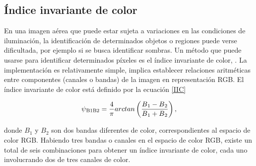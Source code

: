 \subsection{Índice invariante de color} \label{seccion iic}
En una imagen aérea que puede estar sujeta a variaciones en las condiciones de iluminación, la identificación de determinados objetos o regiones puede verse dificultada, por ejemplo si se busca identificar sombras. Un método que puede usarse para identificar determinados píxeles es el índice invariante de color, \cite{gevers_pictoseek_2000, tsai_comparative_2006, singhal_automatic_2014, noauthor_using_nodate, sirmacek_building_2008, chang_unsupervised_nodate}. La implementación es relativamente simple, implica establecer relaciones aritméticas entre componentes (canales o bandas) de la imagen en representación RGB. El índice invariante de color está definido por la ecuación \ref{IIC} 


\begin{equation}
	\psi\textsubscript{B1B2}=\frac{4}{\pi} arctan\left(\frac{B\textsubscript{1}-B\textsubscript{2}}{B\textsubscript{1}+B\textsubscript{2}}\right),\label{IIC}
\end{equation}

 donde $B_1$ y $B_2$ son dos bandas diferentes de color, correspondientes al espacio de color RGB.
Habiendo tres bandas o canales en el espacio de color RGB, existe un total de seis combinaciones para obtener un índice invariante de color, cada uno involucrando dos de tres canales de color.